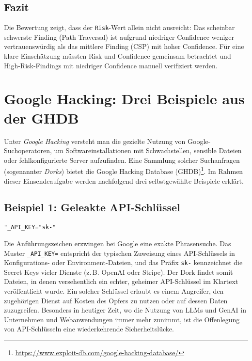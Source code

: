 \documentclass[11pt,a4paper]{article}
\begin{document}
\subsection{Fazit}
Die Bewertung zeigt, dass der \texttt{Risk}-Wert allein nicht ausreicht: Das scheinbar schwerste Finding (Path Traversal) ist aufgrund niedriger Confidence weniger vertrauenswürdig als das mittlere Finding (CSP) mit hoher Confidence. Für eine klare Einschätzung müssten Risk und Confidence gemeinsam betrachtet und High-Risk-Findings mit niedriger Confidence manuell verifiziert werden.

\section{Google Hacking: Drei Beispiele aus der GHDB}
Unter \emph{Google Hacking} versteht man die gezielte Nutzung von Google-Suchoperatoren, um Softwareinstallationen mit Schwachstellen, sensible Dateien oder fehlkonfigurierte Server aufzufinden. Eine Sammlung solcher Suchanfragen (sogenannter \emph{Dorks}) bietet die Google Hacking Database (GHDB)\footnote{\url{https://www.exploit-db.com/google-hacking-database/}}. Im Rahmen dieser Einsendeaufgabe werden nachfolgend drei selbstgewählte Beispiele erklärt.

\subsection{Beispiel 1: Geleakte API-Schlüssel}
\begin{lstlisting}[caption={GHDB-ID 8298}]
"_API_KEY="sk-"
\end{lstlisting}
Die Anführungszeichen erzwingen bei Google eine exakte Phrasensuche. Das Muster \texttt{\_API\_KEY=} entspricht der typischen Zuweisung eines API-Schlüssels in Konfigurations- oder Environment-Dateien, und das Präfix \texttt{sk-} kennzeichnet die Secret Keys vieler Dienste (z.\,B. OpenAI oder Stripe). Der Dork findet somit Dateien, in denen versehentlich ein echter, geheimer API-Schlüssel im Klartext veröffentlicht wurde. Ein solcher Schlüssel erlaubt es einem Angreifer, den zugehörigen Dienst auf Kosten des Opfers zu nutzen oder auf dessen Daten zuzugreifen. Besonders in heutiger Zeit, wo die Nutzung von LLMs und GenAI in Unternehmen und Webanwendungen immer mehr zunimmt, ist die Offenlegung von API-Schlüsseln eine wiederkehrende Sicherheitslücke.
\end{document}
